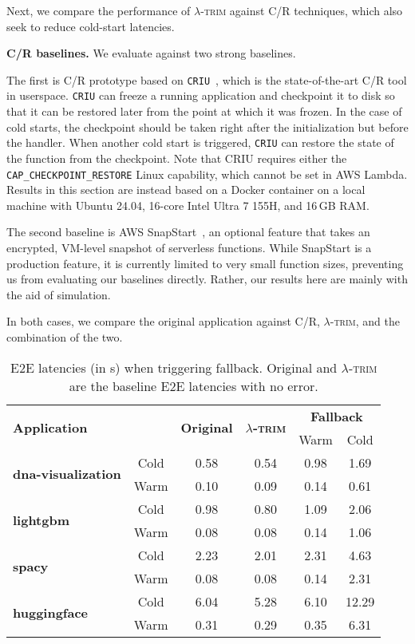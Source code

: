 \documentclass[sigplan,nonacm]{acmart}
\newcommand{\sys}{\textsc{\ensuremath{\lambda}-trim}\xspace}
\newcommand{\heading}[1]{\vspace{4pt}\noindent\textbf{#1.}}
\newcommand{\application}[1]{{\textcolor{pennblue}{\textbf{#1}}}}
\begin{document}
Next, we compare the performance of \sys against C/R techniques, which also seek to reduce cold-start latencies.

\heading{C/R baselines}
We evaluate against two strong baselines.

The first is C/R prototype based on \texttt{CRIU}~\cite{criu}, which is the state-of-the-art C/R tool in userspace.
\texttt{CRIU} can freeze a running application and checkpoint it to disk so that it can be restored later from the point at which it was frozen.
In the case of cold starts, the checkpoint should be taken right after the initialization but before the handler.
When another cold start is triggered, \texttt{CRIU} can restore the state of the function from the checkpoint.
Note that CRIU requires either the \texttt{CAP\_CHECKPOINT\_RESTORE} Linux capability, which cannot be set in AWS Lambda.
Results in this section are instead based on a Docker container on a local machine with Ubuntu 24.04, 16-core Intel Ultra 7 155H, and 16\,GB RAM.




The second baseline is AWS SnapStart~\cite{snapstart}, an optional feature that takes an encrypted, VM-level snapshot of serverless functions.
While SnapStart is a production feature, it is currently limited to very small function sizes, preventing us from evaluating our baselines directly.
Rather, our results here are mainly with the aid of simulation.

In both cases, we compare the original application against C/R, \sys, and the combination of the two.



\begin{table}[t]
\scriptsize
\centering
\begin{tabularx}{\linewidth}{Xccc|cc}
\toprule
\multicolumn{2}{l}{\multirow{2}{*}{\textbf{Application}}} & \multirow{2}{*}{\textbf{Original}} & \multirow{2}{*}{\textbf{\boldmath \sys}} & \multicolumn{2}{c}{\textbf{Fallback}}  \\ 
& & & & Warm & Cold \\
\midrule
\multirow{2}{*}{\application{dna-visualization}} &Cold &0.58 &0.54 &0.98 &1.69 \\
&Warm &0.10 &0.09 &0.14 &0.61 \\ \midrule
\multirow{2}{*}{\application{lightgbm}} &Cold &0.98 &0.80 &1.09 &2.06 \\
&Warm &0.08 &0.08 &0.14 &1.06 \\ \midrule
\multirow{2}{*}{\application{spacy}} &Cold &2.23 &2.01 &2.31 &4.63 \\
&Warm &0.08 &0.08 &0.14 &2.31 \\ \midrule
\multirow{2}{*}{\application{huggingface}} &Cold &6.04 &5.28 &6.10 &12.29 \\
&Warm &0.31 &0.29 &0.35 &6.31 \\
\bottomrule
\end{tabularx}
\caption{E2E latencies (in s) when triggering fallback. Original and \sys are the baseline E2E latencies with no error.}
\label{tab:fallback-overhead}
\end{table}
\end{document}

